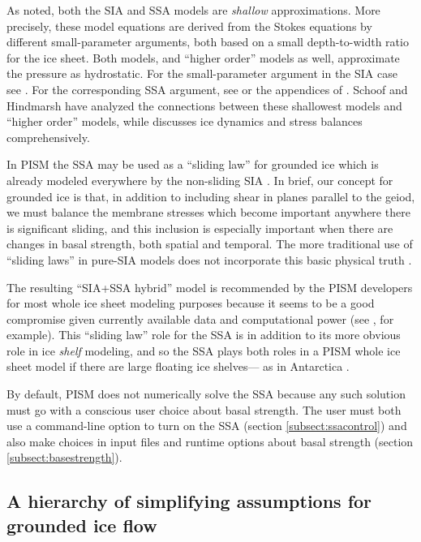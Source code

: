 \documentclass[titlepage,letterpaper,final]{scrartcl}
\begin{document}
As noted, both the SIA and SSA models are \emph{shallow} approximations.  More precisely, these model equations are derived from the Stokes equations by different small-parameter arguments, both based on a small depth-to-width ratio for the ice sheet.  Both models, and ``higher order'' models as well, approximate the pressure as hydrostatic.  For the small-parameter argument in the SIA case see \cite{Fowler}.  For the corresponding SSA argument, see \cite{WeisGreveHutter} or the appendices of \cite{SchoofStream}.  Schoof and Hindmarsh \cite{SchoofHindmarsh} have analyzed the connections between these shallowest models and ``higher order'' models, while \cite{GreveBlatter2009} discusses ice dynamics and stress balances comprehensively.

In PISM the SSA may be used as a ``sliding law'' for grounded ice which is already modeled everywhere by the non-sliding SIA \cite{BBssasliding}.  In brief, our concept for grounded ice is that, in addition to including shear in planes parallel to the geiod, we must balance the membrane stresses which become important anywhere there is significant sliding, and this inclusion is especially important when there are changes in basal strength, both spatial and temporal.  The more traditional use of ``sliding laws'' in pure-SIA models does not incorporate this basic physical truth \cite{Fowler01}.

The resulting ``SIA+SSA hybrid'' model is recommended by the PISM developers for most whole ice sheet modeling purposes because it seems to be a good compromise given currently available data and computational power (see \cite{BKAJS,Martinetal2010TCD,Winkelmannetal2010TCD}, for example).  This ``sliding law'' role for the SSA is in addition to its more obvious role in ice \emph{shelf} modeling, and so the SSA plays both roles in a PISM whole ice sheet model if there are large floating ice shelves--- as in Antarctica \cite{Martinetal2010TCD,Winkelmannetal2010TCD}.

By default, PISM does not numerically solve the SSA because any such solution must go with a conscious user choice about basal strength.  The user must both use a command-line option to turn on the SSA (section \ref{subsect:ssacontrol}) and also make choices in input files and runtime options about basal strength (section \ref{subsect:basestrength}).


\subsection{A hierarchy of simplifying assumptions for grounded ice flow}
\label{sec:model-hierarchy}
\end{document}
